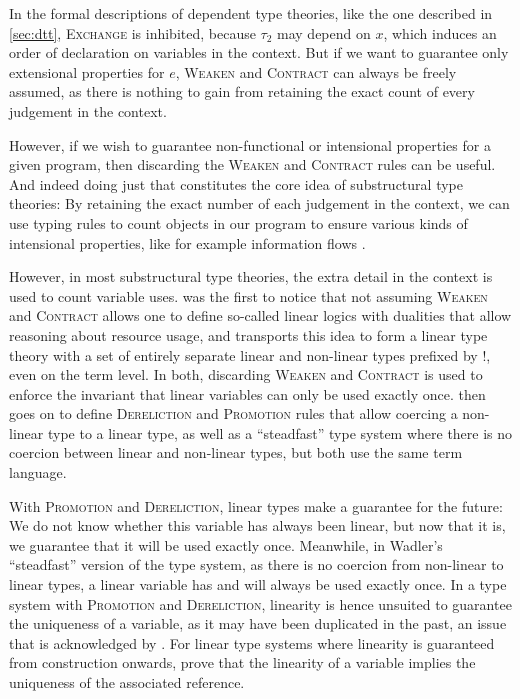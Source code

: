 In the formal descriptions of dependent type theories, like the one described in \cref{sec:dtt}, \textsc{Exchange} is inhibited, because $\tau_2$ may depend on $x$, which induces an order of declaration on variables in the context. But if we want to guarantee only extensional properties for $e$, \textsc{Weaken} and \textsc{Contract} can always be freely assumed, as there is nothing to gain from retaining the exact count of every judgement in the context. 

However, if we wish to guarantee non-functional or intensional properties for a given program, then discarding the \textsc{Weaken} and \textsc{Contract} rules can be useful. And indeed doing just that constitutes the core idea of substructural type theories: By retaining the exact number of each judgement in the context, we can use typing rules to count objects in our program to ensure various kinds of intensional properties, like for example information flows \citep{choudhury_dependent_2022}.

However, in most substructural type theories, the extra detail in the context is used to count variable uses. \cite{girard_linear_1987} was the first to notice that not assuming \textsc{Weaken} and \textsc{Contract} allows one to define so-called linear logics with dualities that allow reasoning about resource usage, and \cite{wadler_linear_1990} transports this idea to form a linear type theory with a set of entirely separate linear and non-linear types prefixed by $!$, even on the term level. In both, discarding \textsc{Weaken} and \textsc{Contract} is used to enforce the invariant that linear variables can only be used exactly once. \cite{wadler_is_1991} then goes on to define \textsc{Dereliction} and \textsc{Promotion} rules that allow coercing a non-linear type to a linear type, as well as a ``steadfast'' type system where there is no coercion between linear and non-linear types, but both use the same term language. 

With \textsc{Promotion} and \textsc{Dereliction}, linear types make a guarantee for the future: We do not know whether this variable has always been linear, but now that it is, we guarantee that it will be used exactly once. Meanwhile, in Wadler's ``steadfast'' version of the type system, as there is no coercion from non-linear to linear types, a linear variable has and will always be used exactly once. In a type system with \textsc{Promotion} and \textsc{Dereliction}, linearity is hence unsuited to guarantee the uniqueness of a variable, as it may have been duplicated in the past, an issue that is acknowledged by \cite{wadler_is_1991}. For linear type systems where linearity is guaranteed from construction onwards, \cite{chirimar_reference_1996} prove that the linearity of a variable implies the uniqueness of the associated reference.

